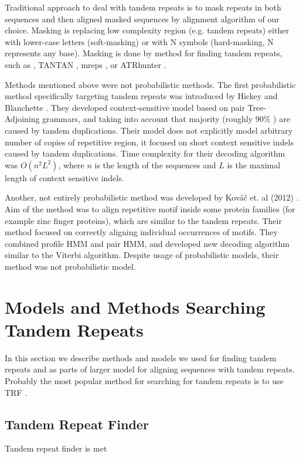 Traditional approach to deal with tandem repeats is to mask repeats in both
sequences and then aligned masked sequences by alignment algorithm of our
choice. Masking is replacing low complexity region (e.g. tandem repeats) either
with lower-case letters (soft-masking) or with N symbols (hard-masking, N
represents any base). Masking is done by method for finding tandem repeats,
such as  \cite{Benson1999}, TANTAN
\cite{Frith2011}, mreps \cite{Kolpakov2003}, or ATRhunter \cite{Wexler2005}. 

Methods mentioned above were not probabilistic methods. The first probabilistic
method specifically targeting tandem repeats was introduced by Hickey and
Blanchette \cite{Hickey2011}. They developed context-sensitive model based on
pair Tree-Adjoining grammars, and taking into account that majority (roughly
$90\%$  \cite{Hickey2011}) are caused by tandem duplications.  Their model does
not explicitly model arbitrary number of copies of repetitive region, it
focused on short context sensitive indels caused by tandem duplications.  Time
complexity for their decoding algorithm was $O(n^2L^2)$, where $n$ is the
length of the sequences and $L$ is the maximal length of context sensitive
indels.

Another, not entirely probabilistic method was developed by Kováč {et. al
(2012)} \nocite{Kovac2012}. Aim of the method was to align repetitive motif
inside some protein families (for example zinc finger proteins), which are
similar to the tandem repeats. Their method focused on correctly aligning
individual occurrences of motifs. They combined profile HMM and pair HMM, and
developed new decoding algorithm similar to the Viterbi algorithm. Despite
usage of probabilistic models, their method was not probabilistic model. 


\section{Models and Methods Searching Tandem Repeats}

In this section we describe methods and models we used for finding tandem
repeats and as parts of larger model for aligning sequences with tandem
repeats. Probably the most popular method for searching for tandem repeats is
to use TRF \cite{Benson1999}.

\subsection{Tandem Repeat Finder}
Tandem repeat finder is met

